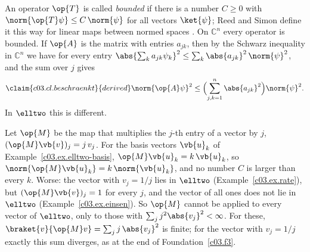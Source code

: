 \begin{vertiefung}[id=c03.v5,
    titel={Bounded and unbounded operators},
    wozu={In the core every operator is defined on the whole space, and Hermitian means the same
      as self-adjoint. Here is why this is no longer so for operators with a restricted domain:
      important operators are unbounded in infinitely many dimensions, and an unbounded
      symmetric operator cannot be defined on the whole space.},
    voraussetzung={Sections~\ref{c03.s8} to~\ref{c03.s10}; Deeper blocks~\ref{c03.v1} and~\ref{c03.v4}
      (the example of a basis of $\elltwo$). The core up to Chapter~4 does not need this block;
      Chapter~5 takes the subject up again with domains.},
    zurueck={In finite dimension every operator is bounded and defined on the whole space, and
      Hermitian and self-adjoint are the same. In infinitely many dimensions an operator comes
      with its domain, and only with it can one say whether a symmetric operator is
      self-adjoint.}]
  An operator $\op{T}$ is called \emph{bounded} if there is a number $C \geq 0$ with
  $\norm{\op{T}\psi} \leq C\, \norm{\psi}$ for all vectors $\ket{\psi}$; Reed and Simon define it
  this way for linear maps between normed spaces . On
  $\mathbb{C}^n$ every operator is bounded. If $\op{A}$ is the matrix with entries $a_{jk}$,
  then by the Schwarz inequality in $\mathbb{C}^n$ we have for every entry
  $\abs{\sum_k a_{jk} \psi_k}^2 \leq \sum_k \abs{a_{jk}}^2\, \norm{\psi}^2$, and the sum over $j$
  gives
  \begin{equation}\label{c03.eq.beschraenkt}\claim{c03.cl.beschraenkt}{derived}
    \norm{\op{A}\psi}^2 \leq \Bigl( \sum_{j,k=1}^{n} \abs{a_{jk}}^2 \Bigr) \norm{\psi}^2 .
  \end{equation}
  In $\elltwo$ this is different.

  \begin{example}\label{c03.ex.unbeschraenkt}
    Let $\op{M}$ be the map that multiplies the $j$-th entry of a vector by $j$,
    $(\op{M}\vb{v})_j = j\, v_j$. For the basis vectors $\vb{u}_k$ of
    Example~\ref{c03.ex.elltwo-basis}, $\op{M}\vb{u}_k = k\, \vb{u}_k$, so
    $\norm{\op{M}\vb{u}_k} = k\, \norm{\vb{u}_k}$, and no number $C$ is larger than every $k$.
    Worse: the vector with $v_j = 1/j$ lies in $\elltwo$ (Example~\ref{c03.ex.rate}), but
    $(\op{M}\vb{v})_j = 1$ for every $j$, and the vector of all ones does not lie in $\elltwo$
    (Example~\ref{c03.ex.einsen}). So $\op{M}$ cannot be applied to every vector of $\elltwo$,
    only to those with $\sum_j j^2 \abs{v_j}^2 < \infty$. For these,
    $\braket{v}{\op{M}v} = \sum_j j\, \abs{v_j}^2$ is finite; for the vector with $v_j = 1/j$
    exactly this sum diverges, as at the end of Foundation~\ref{c03.f3}.
  \end{example}


\end{vertiefung}
